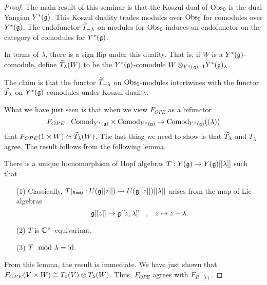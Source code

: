 \documentclass[11pt]{amsart}
\def\yscomod{{\rm Comod}_{Y^*(\fg)}}
\def\yslcomod{{\rm Comod}_{Y^*(\fg)}((\lambda))}
\begin{document}
\begin{proof}
The main result of this seminar is that the Koszul dual of $\Obs_0$ is the dual Yangian $Y^*(\fg)$. 
This Koszul duality trades modules over $\Obs_0$ for comodules over $Y^*(\fg)$. 
The endofunctor $\Tilde{T}_{-\lambda}$ on modules for $\Obs_0$ induces an endofunctor on the category of comodules for $Y^*(\fg)$. 

In terms of $\lambda$, there is a sign flip under this duality. 
That is, if $W$ is a $Y^*(\fg)$-comodule, define $\Tilde{T}_\lambda(W)$ to be the $Y^*(\fg)$-comodule $W \tensor_{Y^*(\fg)} \;_1Y^*(\fg)_\lambda$. 

The claim is that the functor $\Tilde{T}_{-\lambda}$ on $\Obs_0$-modules intertwines with the functor $\Tilde{T}_{\lambda}$ on $Y^*(\fg)$-comodules under Koszul duality. 

What we have just seen is that when we view $F_{OPE}$ as a bifunctor
\[
F_{OPE} : \yscomod \times \yscomod \to \yslcomod
\]
that $F_{OPE} (1 \times W) \simeq \Tilde{T}_\lambda(W)$. 
The last thing we need to show is that $\Tilde{T}_\lambda$ and $T_{\lambda}$ agree. 
The result follows from the following lemma.

\begin{lem}
There is a unique homomorphism of Hopf algebras $T : Y(\fg) \to Y(\fg) [[\lambda]]$
 such that
\begin{enumerate}
\item[(1)] 
Classically, $T|_{\hbar = 0} : U(\fg[[z]]) \to U(\fg[[z]])[[\lambda]]$ arises from the map of Lie algebras
\[
\fg[[z]] \to \fg[[z,\lambda]] \;\;\; , \;\;\; z \mapsto z + \lambda .
\]
\item[(2)] $T$ is $\CC^\times$-equivariant.
\item[(3)] $T \mod \lambda = {\rm id}$. 
\end{enumerate}
\end{lem}

From this lemma, the result is immediate.
We have just shown that $F_{OPE}(V \times W) \cong T_0(V) \tensor T_{\lambda}(W)$. 
Thus, $F_{OPE}$ agrees with $F_{R(\lambda)}$.

\end{proof}
\end{document}
